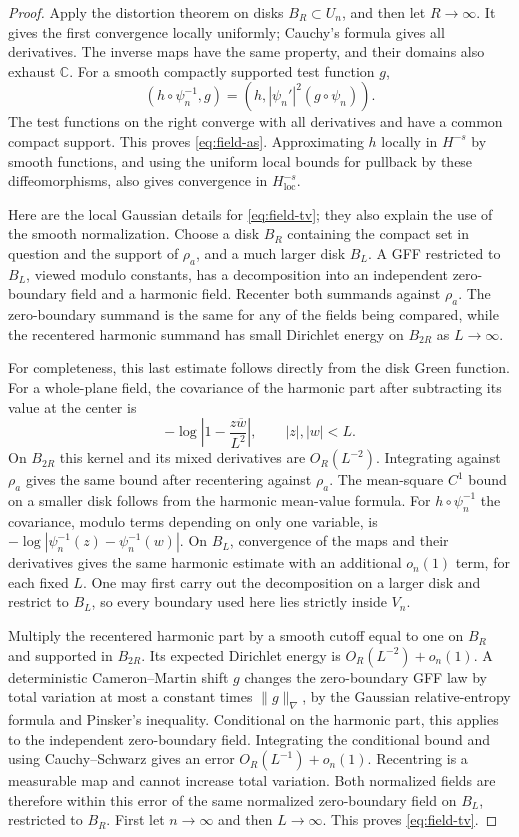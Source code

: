 \documentclass[11pt]{article}
\theoremstyle{definition}
\theoremstyle{remark}
\newcommand{\C}{\mathbb C}
\begin{document}
\begin{proof}
Apply the distortion theorem on disks $B_R\subset U_n$, and then
let $R\to\infty$. It gives the first convergence locally uniformly;
Cauchy's formula gives all derivatives. The inverse maps have the
same property, and their domains also exhaust $\C$. For a smooth
compactly supported test function $g$,
\[
 (h\circ\psi_n^{-1},g)
       =(h,|\psi_n'|^2(g\circ\psi_n)).
\]
The test functions on the right converge with all derivatives and
have a common compact support. This proves \eqref{eq:field-as}.
Approximating $h$ locally in $H^{-s}$ by smooth functions, and
using the uniform local bounds for pullback by these diffeomorphisms,
also gives convergence in $H^{-s}_{\mathrm{loc}}$.

Here are the local Gaussian details for \eqref{eq:field-tv}; they
also explain the use of the smooth normalization. Choose a disk
$B_R$ containing the compact set in question and the support of
$\rho_a$, and a much larger disk $B_L$. A GFF restricted to $B_L$,
viewed modulo constants, has a decomposition into an independent
zero-boundary field and a harmonic field. Recenter both summands
against $\rho_a$. The zero-boundary summand is the same for any
of the fields being compared, while the recentered harmonic
summand has small Dirichlet energy on $B_{2R}$ as $L\to\infty$.

For completeness, this last estimate follows directly from the
disk Green function. For a whole-plane field, the covariance of
the harmonic part after subtracting its value at the center is
\[
 -\log\left|1-\frac{z\overline w}{L^2}\right|,
 \qquad |z|,|w|<L.
\]
On $B_{2R}$ this kernel and its mixed derivatives are
$O_R(L^{-2})$. Integrating against $\rho_a$ gives the same bound
after recentering against $\rho_a$. The mean-square $C^1$ bound
on a smaller disk follows from the harmonic mean-value formula.
For $h\circ\psi_n^{-1}$ the covariance, modulo terms depending
on only one variable, is
$-\log|\psi_n^{-1}(z)-\psi_n^{-1}(w)|$.
On $B_L$, convergence of the maps and their derivatives gives the
same harmonic estimate with an additional $o_n(1)$ term, for
each fixed $L$. One may first carry out the decomposition on a
larger disk and restrict to $B_L$, so every boundary used here
lies strictly inside $V_n$.

Multiply the recentered harmonic part by a smooth cutoff equal
to one on $B_R$ and supported in $B_{2R}$. Its expected Dirichlet
energy is $O_R(L^{-2})+o_n(1)$. A deterministic Cameron--Martin
shift $g$ changes the zero-boundary GFF law by total variation at
most a constant times $\|g\|_\nabla$, by the Gaussian
relative-entropy formula and Pinsker's inequality. Conditional
on the harmonic part, this applies to the independent
zero-boundary field. Integrating the conditional bound and using
Cauchy--Schwarz gives an error
$O_R(L^{-1})+o_n(1)$. Recentring is a measurable map and cannot
increase total variation. Both normalized fields are therefore
within this error of the same normalized zero-boundary field on
$B_L$, restricted to $B_R$. First let $n\to\infty$ and then
$L\to\infty$. This proves \eqref{eq:field-tv}.
\end{proof}
\end{document}
